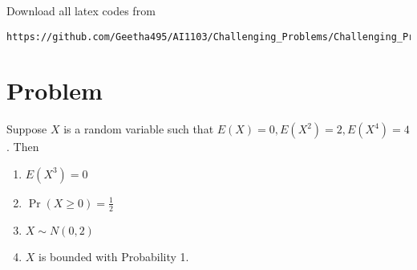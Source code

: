 \documentclass[journal,12pt,twocolumn]{IEEEtran}
\begin{document}
Download all latex codes from 
\begin{lstlisting}
https://github.com/Geetha495/AI1103/Challenging_Problems/Challenging_Problem2/blob/main/Challenging_Problem2.tex
\end{lstlisting}


\section{Problem}
Suppose $X$ is a random variable such that $E(X)=0 , E(X^2)=2 , E(X^4)=4 $. Then 
\begin{enumerate}
    \item $E(X^3)=0$
    \item $\Pr(X\geq 0) = \frac{1}{2}$
    \item $X \sim N(0,2)$ 
\item $X$ is bounded with Probability 1.
\end{enumerate}
\end{document}
